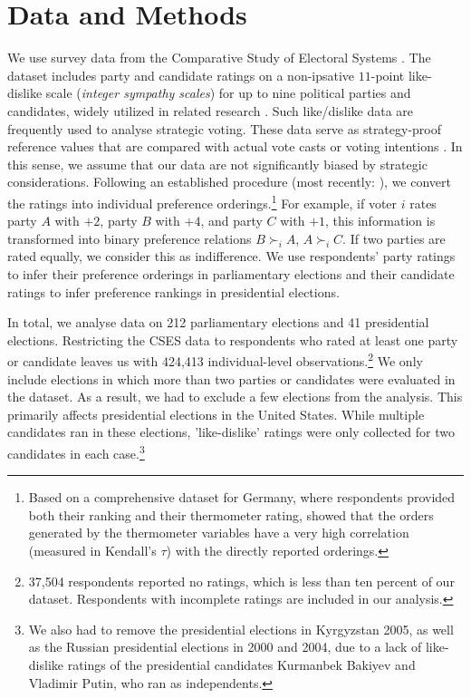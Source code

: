\documentclass[12pt]{scrartcl}
\newcommand{\nbparliament}{212 }
\newcommand{\nbpresidential}{41 }
\begin{document}
\section{Data and Methods}\label{sec.datamethods}  
We use survey data from the Comparative Study of Electoral Systems \citep{CSES2020}. The dataset includes party and candidate ratings on a non-ipsative $11$-point like-dislike scale (\emph{integer sympathy scales}) for up to nine political parties and candidates, widely utilized in related research \citep[e.g.,][]{Kalandrakis2022, Desai2025}. Such like/dislike data are frequently used to analyse strategic voting. These data serve as strategy-proof reference values that are compared with actual vote casts or voting intentions \citep{Abramson2009, Eggers2024, Nunez2024}. In this sense, we assume that our data are not significantly biased by strategic considerations. Following an established procedure (most recently: \cite{Lachat2024}), we convert the ratings into individual preference orderings.\footnote{
    Based on a comprehensive dataset for Germany, where respondents provided both their ranking and their thermometer rating, \cite{Barbaro2022} showed that the orders generated by the thermometer variables have a very high correlation (measured in Kendall's $\tau$) with the directly reported orderings.
} For example, if voter $i$ rates party $A$ with $+2$, party $B$ with $+4$, and party $C$ with $+1$, this information is transformed into binary preference relations $B \succ_i A$, $A \succ_i C$. If two parties are rated equally, we consider this as indifference. We use respondents' party ratings to infer their preference orderings in parliamentary elections and their candidate ratings to infer preference rankings in presidential elections.

In total, we analyse data on \nbparliament parliamentary elections and \nbpresidential presidential elections. Restricting the CSES data to respondents who rated at least one party or candidate leaves us with 424,413 individual-level observations.\footnote{
    37,504 respondents reported no ratings, which is less than ten percent of our dataset. Respondents with incomplete ratings are included in our analysis.
} We only include elections in which more than two parties or candidates were evaluated in the dataset. As a result, we had to exclude a few elections from the analysis. This primarily affects presidential elections in the United States. While multiple candidates ran in these elections, 'like-dislike' ratings were only collected for two candidates in each case.\footnote{We also had to remove the presidential elections in Kyrgyzstan 2005, as well as the Russian presidential elections in 2000 and 2004, due to a lack of like-dislike ratings of the presidential candidates Kurmanbek Bakiyev and Vladimir Putin, who ran as independents.}
\end{document}
